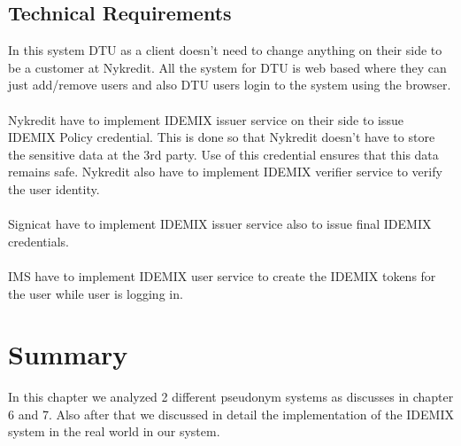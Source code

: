 \subsection{Technical Requirements}
In this system DTU as a client doesn't need to change anything on their side to be a customer at Nykredit. All the system for DTU is web based where they can just add/remove users and also DTU users login to the system using the browser.
\\
\\Nykredit have to implement IDEMIX issuer service on their side to issue IDEMIX Policy credential. This is done so that Nykredit doesn’t have to store the sensitive data at the 3rd party. Use of this credential ensures that this data remains safe. Nykredit also have to implement IDEMIX verifier service to verify the user identity.
\\
\\Signicat have to implement IDEMIX issuer service also to issue final IDEMIX credentials.
\\\\
IMS have to implement IDEMIX user service to create the IDEMIX tokens for the user while user is logging in.
\section{Summary}
In this chapter we analyzed 2 different pseudonym systems as discusses in chapter 6 and 7. Also after that we discussed in detail the implementation of the IDEMIX system in the real world in our system.
